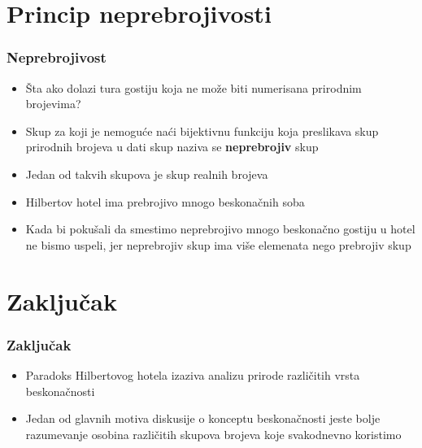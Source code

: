 \documentclass{beamer}
\begin{document}
\section{Princip neprebrojivosti}
\begin{frame}[fragile]\frametitle{Neprebrojivost}
\begin{itemize}
 \item Šta ako dolazi tura gostiju koja ne može biti numerisana prirodnim brojevima?
    \item Skup za koji je nemoguće naći bijektivnu funkciju koja preslikava skup prirodnih brojeva u dati skup naziva se \textbf{neprebrojiv} skup
    \item Jedan od takvih skupova je skup realnih brojeva
\end{itemize}
\begin{itemize}
    \item Hilbertov hotel ima prebrojivo mnogo beskonačnih soba
    \item Kada bi pokušali da smestimo neprebrojivo mnogo beskonačno gostiju u hotel ne bismo uspeli, jer neprebrojiv skup ima više elemenata nego prebrojiv skup
\end{itemize}
\end{frame}
\section{Zaključak}
\begin{frame}[fragile]\frametitle{Zaključak}
\begin{itemize}
 \item Paradoks Hilbertovog hotela izaziva analizu prirode različitih vrsta beskonačnosti
    \item Jedan od glavnih motiva diskusije o konceptu beskonačnosti jeste bolje razumevanje osobina različitih
    skupova brojeva koje svakodnevno koristimo 

\end{itemize}
\end{frame}
\end{document}
